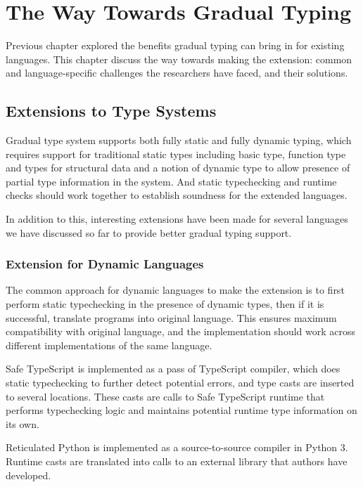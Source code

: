 
\renewcommand{\thechapter}{3}

\chapter{The Way Towards Gradual Typing}

Previous chapter explored the benefits gradual typing
can bring in for existing languages.
This chapter discuss the way towards making the extension:
common and language-specific challenges the researchers have faced,
and their solutions.

\section{Extensions to Type Systems}

Gradual type system supports both fully static and fully dynamic typing,
which requires support for traditional static types including
basic type, function type and types for structural data
and a notion of dynamic type to allow presence of partial type information
in the system. And static typechecking and runtime checks should work together
to establish soundness for the extended languages.

In addition to this, interesting extensions have been made
for several languages we have discussed so far to provide better gradual
typing support.

\subsection{Extension for Dynamic Languages}

The common approach for dynamic languages to make the extension
is to first perform static typechecking in the presence of dynamic types,
then if it is successful, translate programs into original language.
This ensures maximum compatibility with original language, and
the implementation should work across different implementations of the same language.

Safe TypeScript is implemented as a pass of TypeScript compiler,
which does static typechecking to further detect potential errors,
and type casts are inserted to several locations. These casts are calls
to Safe TypeScript runtime that performs typechecking logic and maintains
potential runtime type information on its own.

Reticulated Python is implemented as a source-to-source compiler
in Python 3. Runtime casts are translated into calls to an external library
that authors have developed.

